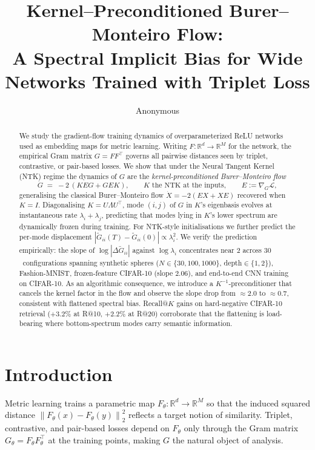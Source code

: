 \documentclass[11pt]{article}
\title{Kernel--Preconditioned Burer--Monteiro Flow:\\
A Spectral Implicit Bias for Wide Networks Trained with Triplet Loss}
\author{Anonymous}
\date{}
\theoremstyle{definition}
\theoremstyle{plain}
\newcommand{\R}{\mathbb{R}}
\newcommand{\norm}[1]{\left\lVert#1\right\rVert}
\begin{document}
\maketitle

\begin{abstract}
We study the gradient-flow training dynamics of overparameterized ReLU networks
used as embedding maps for metric learning. Writing $F:\R^d\to\R^M$ for the
network, the empirical Gram matrix $G=FF^\top$ governs all pairwise distances
seen by triplet, contrastive, or pair-based losses. We show that under the
Neural Tangent Kernel (NTK) regime the dynamics of $G$ are the
\emph{kernel-preconditioned Burer--Monteiro flow}
\[
   \dot G \;=\; -2\,(K E G + G E K),
   \qquad K \text{ the NTK at the inputs}, \qquad E := \nabla_G \mathcal{L},
\]
generalising the classical Burer--Monteiro flow $\dot X=-2(EX+XE)$ recovered when
$K=I$. Diagonalising $K=U\Lambda U^\top$, mode $(i,j)$ of $G$ in $K$'s
eigenbasis evolves at instantaneous rate $\lambda_i+\lambda_j$, predicting that
modes lying in $K$'s lower spectrum are dynamically frozen during training.
For NTK-style initialisations we further predict the per-mode displacement
$|\widetilde G_{ii}(T)-\widetilde G_{ii}(0)|\propto \lambda_i^2$. We verify
the prediction empirically: the slope of $\log|\Delta\widetilde G_{ii}|$
against $\log\lambda_i$ concentrates near $2$ across $30$~configurations spanning
synthetic spheres ($N\in\{30,100,1000\}$, depth$\in\{1,2\}$),
Fashion-MNIST, frozen-feature CIFAR-10 (slope $2.06$), and end-to-end CNN
training on CIFAR-10. As an algorithmic consequence, we introduce a
$K^{-1}$-preconditioner that cancels the kernel factor in the flow and observe
the slope drop from $\approx 2.0$ to $\approx 0.7$, consistent with
flattened spectral bias. Recall@$K$ gains on hard-negative CIFAR-10 retrieval
($+3.2\%$ at R@10, $+2.2\%$ at R@20) corroborate that the flattening is
load-bearing where bottom-spectrum modes carry semantic information.
\end{abstract}

\section{Introduction}
\label{sec:intro}

Metric learning trains a parametric map $F_\theta:\R^d\to\R^M$ so that the
induced squared distance $\norm{F_\theta(x)-F_\theta(y)}_2^2$ reflects a target
notion of similarity. Triplet, contrastive, and pair-based losses depend on
$F_\theta$ only through the Gram matrix $G_\theta=F_\theta F_\theta^\top$ at
the training points, making $G$ the natural object of analysis.
\end{document}

